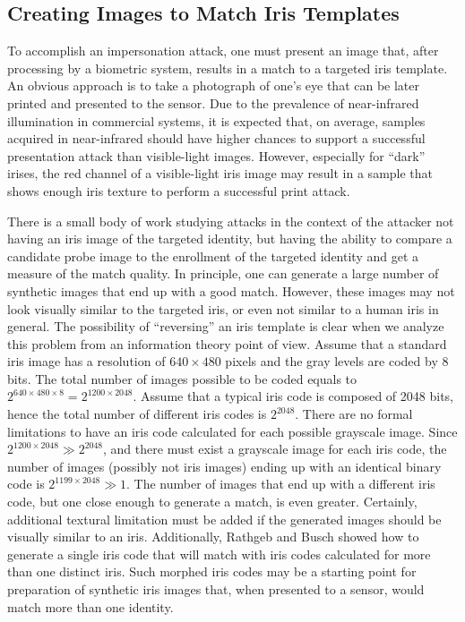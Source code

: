 \documentclass[format=acmsmall, review=false, timestamp=false]{acmart}
\begin{document}
\subsection{Creating Images to Match Iris Templates}
\label{sec:KnownVulnerabilities_Samples_Matching}

To accomplish an impersonation attack, one must present an image that, after processing by a biometric system, results in a match to a targeted iris template. An obvious approach is to take a photograph of one's eye that can be later printed and presented to the sensor. Due to the prevalence of near-infrared illumination in commercial systems, it is expected that, on average, samples acquired in near-infrared should have higher chances to support a successful presentation attack than visible-light images. However, especially for ``dark'' irises, the red channel of a visible-light iris image may result in a sample that shows enough iris texture to perform a successful print attack. 

There is a small body of work studying attacks in the context of the attacker not having an iris image of the targeted identity, but having the ability to compare a candidate probe image to the enrollment of the targeted identity and get a measure of the match quality. In principle, one can generate a large number of synthetic images that end up with a good match. However, these images may not look visually similar to the targeted iris, or even not similar to a human iris in general. The possibility of ``reversing'' an iris template is clear when we analyze this problem from an information theory point of view. Assume that a standard iris image has a resolution of $640\times480$ pixels and the gray levels are coded by 8 bits. The total number of images possible to be coded equals to $2^{640\times480\times8}=2^{1200\times2048}$. Assume that a typical iris code is composed of 2048 bits, hence the total number of different iris codes is $2^{2048}$. There are no formal limitations to have an iris code calculated for each possible grayscale image. Since $2^{1200\times2048} \gg 2^{2048}$, and there must exist a grayscale image for each iris code, the number of images (possibly not iris images) ending up with an identical binary code is $2^{1199\times2048} \gg 1$. The number of images that end up with a different iris code, but one close enough to generate a match, is even greater. Certainly, additional textural limitation must be added if the generated images should be visually similar to an iris. {Additionally, Rathgeb and Busch \cite{Rathgeb_IJCB_2017} showed how to generate a single iris code that will match with iris codes calculated for more than one distinct iris. Such morphed iris codes may be a starting point for preparation of synthetic iris images that, when presented to a sensor, would match more than one identity.}
\end{document}
